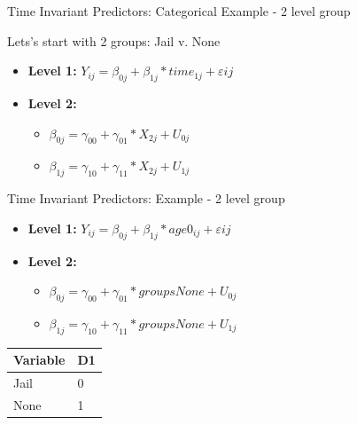 \begin{frame}{Time Invariant Predictors: Categorical Example - 2 level
group}

Lets's start with 2 groups: Jail v. None

\begin{itemize}
  \item \textbf{Level 1:} $Y_{ij} = \beta_{0j} + \beta_{1j}*time_{1j} + \varepsilon{ij}$
  \item \textbf{Level 2:} 
    \begin{itemize} 
      \item $\beta_{0j} = \gamma_{00} + \gamma_{01}*X_{2j} + U_{0j}$
      \item $\beta_{1j} = \gamma_{10} + \gamma_{11}*X_{2j} + U_{1j}$
    \end{itemize}
\end{itemize}

\end{frame}

\begin{frame}{Time Invariant Predictors: Example - 2 level group}

\begin{itemize}
  \item \textbf{Level 1:} $Y_{ij} = \beta_{0j} + \beta_{1j}*age0_{ij} + \varepsilon{ij}$
  \item \textbf{Level 2:} 
    \begin{itemize} 
      \item $\beta_{0j} = \gamma_{00} + \gamma_{01}*groupsNone + U_{0j}$
      \item $\beta_{1j} = \gamma_{10} + \gamma_{11}*groupsNone + U_{1j}$
    \end{itemize}
\end{itemize}

\begin{longtable}[]{@{}ll@{}}
\toprule
Variable & D1\tabularnewline
\midrule
\endhead
Jail & 0\tabularnewline
None & 1\tabularnewline
\bottomrule
\end{longtable}

\end{frame}

